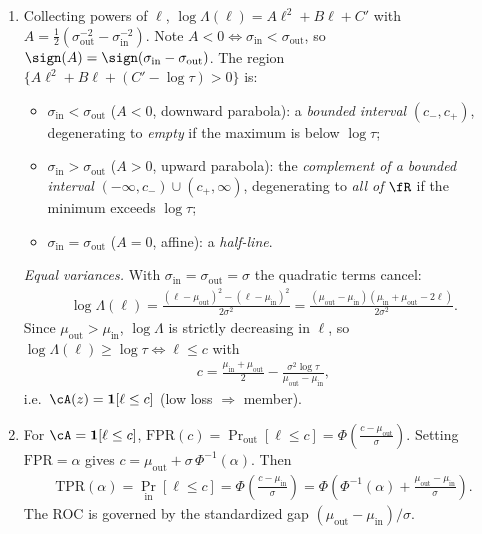 \documentclass[12pt]{article}
\begin{document}
\begin{enumerate}
\begin{solution}
\begin{enumerate}
    \item Collecting powers of $\ell$, $\log\Lambda(\ell) = A\ell^2 + B\ell + C'$ with $A = \frac{1}{2}(\sigma_{\mathrm{out}}^{-2} - \sigma_{\mathrm{in}}^{-2})$. Note $A < 0 \iff \sigma_{\mathrm{in}} < \sigma_{\mathrm{out}}$, so $\sign(A) = \sign(\sigma_{\mathrm{in}} - \sigma_{\mathrm{out}})$. The region $\{A\ell^2 + B\ell + (C' - \log\tau) > 0\}$ is:
    \begin{itemize}
        \item $\sigma_{\mathrm{in}} < \sigma_{\mathrm{out}}$ ($A < 0$, downward parabola): a \emph{bounded interval} $(c_-, c_+)$, degenerating to \emph{empty} if the maximum is below $\log\tau$;
        \item $\sigma_{\mathrm{in}} > \sigma_{\mathrm{out}}$ ($A > 0$, upward parabola): the \emph{complement of a bounded interval} $(-\infty,c_-)\cup(c_+,\infty)$, degenerating to \emph{all of $\fR$} if the minimum exceeds $\log\tau$;
        \item $\sigma_{\mathrm{in}} = \sigma_{\mathrm{out}}$ ($A = 0$, affine): a \emph{half-line}.
    \end{itemize}
    \emph{Equal variances.} With $\sigma_{\mathrm{in}} = \sigma_{\mathrm{out}} = \sigma$ the quadratic terms cancel:
    \begin{align*}
        \log\Lambda(\ell) = \frac{(\ell-\mu_{\mathrm{out}})^2 - (\ell-\mu_{\mathrm{in}})^2}{2\sigma^2} = \frac{(\mu_{\mathrm{out}}-\mu_{\mathrm{in}})(\mu_{\mathrm{in}}+\mu_{\mathrm{out}} - 2\ell)}{2\sigma^2}.
    \end{align*}
    Since $\mu_{\mathrm{out}} > \mu_{\mathrm{in}}$, $\log\Lambda$ is strictly decreasing in $\ell$, so $\log\Lambda(\ell) \ge \log\tau \iff \ell \le c$ with
    \begin{align*}
        c = \frac{\mu_{\mathrm{in}}+\mu_{\mathrm{out}}}{2} - \frac{\sigma^2\log\tau}{\mu_{\mathrm{out}}-\mu_{\mathrm{in}}},
    \end{align*}
    i.e.\ $\cA(z) = \mathbf{1}[\ell \le c]$ (low loss $\Rightarrow$ member).

    \item For $\cA = \mathbf{1}[\ell \le c]$, $\mathrm{FPR}(c) = \Pr_{\mathrm{out}}[\ell \le c] = \Phi(\frac{c-\mu_{\mathrm{out}}}{\sigma})$. Setting $\mathrm{FPR} = \alpha$ gives $c = \mu_{\mathrm{out}} + \sigma\,\Phi^{-1}(\alpha)$. Then
    \begin{align*}
        \mathrm{TPR}(\alpha) = \Pr_{\mathrm{in}}[\ell \le c] = \Phi\!\left(\frac{c-\mu_{\mathrm{in}}}{\sigma}\right) = \Phi\!\left(\Phi^{-1}(\alpha) + \frac{\mu_{\mathrm{out}}-\mu_{\mathrm{in}}}{\sigma}\right).
    \end{align*}
    The ROC is governed by the standardized gap $(\mu_{\mathrm{out}}-\mu_{\mathrm{in}})/\sigma$.
\end{enumerate}
\end{solution}


\end{enumerate}
\end{document}
